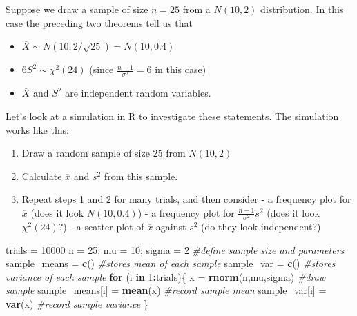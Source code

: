\documentclass[
]{book}
\newenvironment{Shaded}{\begin{snugshade}}{\end{snugshade}}
\newcommand{\CommentTok}[1]{\textcolor[rgb]{0.56,0.35,0.01}{\textit{#1}}}
\newcommand{\ControlFlowTok}[1]{\textcolor[rgb]{0.13,0.29,0.53}{\textbf{#1}}}
\newcommand{\DecValTok}[1]{\textcolor[rgb]{0.00,0.00,0.81}{#1}}
\newcommand{\FunctionTok}[1]{\textcolor[rgb]{0.13,0.29,0.53}{\textbf{#1}}}
\newcommand{\NormalTok}[1]{#1}
\newcommand{\OtherTok}[1]{\textcolor[rgb]{0.56,0.35,0.01}{#1}}
\newcommand{\SpecialCharTok}[1]{\textcolor[rgb]{0.81,0.36,0.00}{\textbf{#1}}}
\providecommand{\tightlist}{%
  \setlength{\itemsep}{0pt}\setlength{\parskip}{0pt}}
\theoremstyle{definition}
\theoremstyle{definition}
\theoremstyle{definition}
\theoremstyle{definition}
\theoremstyle{remark}
\begin{document}
Suppose we draw a sample of size \(n = 25\) from a \(N(10,2)\) distribution. In this case the preceding two theorems tell us that

\begin{itemize}
\tightlist
\item
  \(\overline{X} \sim N(10,2/\sqrt{25}) = N(10,0.4)\)
\item
  \(6 S^2 \sim \chi^2(24)\) (since \(\frac{n-1}{\sigma^2} = 6\) in this case)
\item
  \(\overline{X}\) and \(S^2\) are independent random variables.
\end{itemize}

Let's look at a simulation in R to investigate these statements. The simulation works like this:

\begin{enumerate}
\def\labelenumi{\arabic{enumi}.}
\tightlist
\item
  Draw a random sample of size \(25\) from \(N(10,2)\)
\item
  Calculate \(\overline{x}\) and \(s^2\) from this sample.
\item
  Repeat steps 1 and 2 for many trials, and then consider
  - a frequency plot for \(\overline{x}\) (does it look \(N(10,0.4)\))
  - a frequency plot for \(\frac{n-1}{\sigma^2}s^2\) (does it look \(\chi^2(24)\)?)
  - a scatter plot of \(\overline{x}\) against \(s^2\) (do they look independent?)
\end{enumerate}

\begin{Shaded}
\begin{Highlighting}[]
\NormalTok{trials }\OtherTok{=} \DecValTok{10000}
\NormalTok{n }\OtherTok{=} \DecValTok{25}\NormalTok{; mu }\OtherTok{=} \DecValTok{10}\NormalTok{; sigma }\OtherTok{=} \DecValTok{2} \CommentTok{\#define sample size and parameters}
\NormalTok{sample\_means }\OtherTok{=} \FunctionTok{c}\NormalTok{() }\CommentTok{\#stores mean of each sample}
\NormalTok{sample\_var }\OtherTok{=} \FunctionTok{c}\NormalTok{() }\CommentTok{\#stores variance of each sample}
\ControlFlowTok{for}\NormalTok{ (i }\ControlFlowTok{in} \DecValTok{1}\SpecialCharTok{:}\NormalTok{trials)\{}
\NormalTok{  x }\OtherTok{=} \FunctionTok{rnorm}\NormalTok{(n,mu,sigma) }\CommentTok{\#draw sample}
\NormalTok{  sample\_means[i] }\OtherTok{=} \FunctionTok{mean}\NormalTok{(x) }\CommentTok{\#record sample mean}
\NormalTok{  sample\_var[i] }\OtherTok{=} \FunctionTok{var}\NormalTok{(x) }\CommentTok{\#record sample variance}
\NormalTok{\}}
\end{Highlighting}
\end{Shaded}
\end{document}
